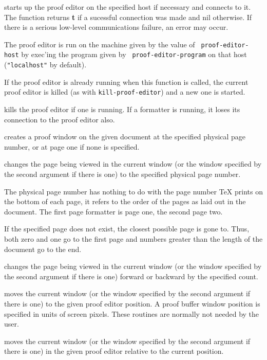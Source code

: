 %
starts up the proof editor on the specified host if necessary and
connects to it.  The function returns {\bf t} if a sucessful
connection was made and nil otherwise.  If there is a serious
low-level communications failure, an error may occur.

The proof editor is run on the machine given by the value of {\tt
proof-editor-host} by exec'ing the program given by {\tt
proof-editor-program} on that host ({\tt "localhost"} by default).

If the proof editor is already running when this function
is called, the current proof editor is killed (as with
{\tt kill-proof-editor}) and a new one is started.

%
kills the proof editor if one is running.  If a formatter is running,
it loses its connection to the proof editor also.

%
creates a proof window on the given document at the specified physical
page number, or at page one if none is specified.

%
changes the page being viewed in the current window (or the window
specified by the second argument if there is one) to the specified
physical page number.

The physical page number has nothing to do with the page number {\TeX}
prints on the bottom of each page, it refers to the order of the pages
as laid out in the document.  The first page formatter is page one,
the second page two.

If the specified page does not exist, the closest possible page is
gone to.  Thus, both zero and one go to the first page and numbers
greater than the length of the document go to the end.

%
changes the page being viewed in the current window (or the window
specified by the second argument if there is one) forward or backward
by the specified count.

%
moves the current window (or the window specified by the second
argument if there is one) to the given proof editor position.
A proof buffer window position is specified in units of screen pixels.
These routines are normally not needed by the user.

%
moves the current window (or the window specified by the second
argument if there is one) in the given proof editor relative to the
current position.

